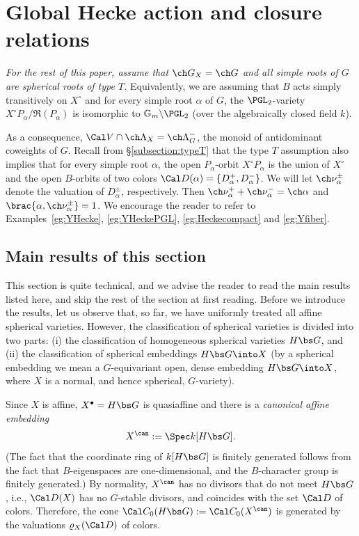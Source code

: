 \documentclass[final]{amsart}
\theoremstyle{remark}
\theoremstyle{definition}
\numberwithin{equation}{section}
\begin{document}
\section{Global Hecke action and closure relations} \label{sect:Heckeact}


\emph{For the rest of this paper, assume that $\ch G_X = \ch G$
and all simple roots of $G$ are spherical roots of type $T$.} Equivalently, 
we are assuming that $B$ acts simply transitively on $X^\circ$ and 
for every simple root $\alpha$ of $G$, the $\PGL_2$-variety $X^\circ P_\alpha/\mathfrak R(P_\alpha)$ is isomorphic to $\mathbb G_m\backslash\PGL_2$ (over the algebraically closed field $k$).

\smallskip

As a consequence, $\Cal V \cap \ch\Lambda_X = \ch\Lambda^-_G$, the monoid of antidominant coweights of $G$. 
Recall from \S\ref{subsection:typeT} that 
the type $T$ assumption also implies that for every simple root $\alpha$, 
the open $P_\alpha$-orbit 
$X^\circ P_\alpha$ is the union of $X^\circ$ and the open $B$-orbits of 
two colors $\Cal D(\alpha) = \{ D_\alpha^+,D_\alpha^- \}$. 
We will let $\ch\nu_\alpha^\pm$ denote the valuation of $D_\alpha^\pm$, respectively.
Then $\ch\nu_\alpha^+ + \ch\nu_\alpha^- = \ch\alpha$ 
and $\brac{\alpha, \ch\nu_\alpha^\pm} = 1$. 
We encourage the reader to refer to Examples~\ref{eg:YHecke}, \ref{eg:YHeckePGL}, \ref{eg:Heckecompact} and \ref{eg:Yfiber}.

\subsection{Main results of this section}

This section is quite technical, and we advise the reader to read the main results listed here, and skip the rest of the section at first reading. Before we introduce the results, let us observe that, so far, we have uniformly treated all affine spherical varieties. 
However, the classification of spherical varieties is divided into two parts: 
(i) the classification of homogeneous spherical varieties $H\bs G$, and (ii) the
classification of spherical embeddings $H\bs G \into X$ (by a spherical embedding we mean a $G$-equivariant open, dense embedding $H\bs G \into X$, where $X$ is a normal, and hence spherical, $G$-variety). 

Since $X$ is affine, $X^\bullet=H\bs G$ is quasiaffine and there is a 
\emph{canonical affine embedding} 
\[ X^\can := \Spec k[H\bs G]. \] 
(The fact that the coordinate ring of $k[H\bs G]$ is finitely generated follows from the fact that $B$-eigenspaces are one-dimensional, and the $B$-character group is finitely generated.) By normality, $X^\can$ has no divisors that do not meet $H\bs G$, 
i.e., $\Cal D(X)$ has no $G$-stable divisors, and coincides with the set $\Cal D$ of colors. 
Therefore, the cone $\Cal C_0(H\bs G):= \Cal C_0(X^\can)$ 
is generated by the valuations $\varrho_X(\Cal D)$ of colors.
\end{document}
